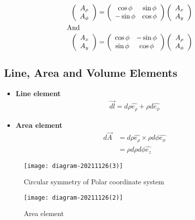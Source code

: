 \begin{align*}
\left(\begin{array}{c}
A_{\rho} \\
A_{\phi}
\end{array}\right)&=\left(\begin{array}{cc}
\cos \phi & \sin \phi \\
-\sin \phi & \cos \phi
\end{array}\right)\left(\begin{array}{c}
A_{x} \\
A_{y}
\end{array}\right) \\\intertext { And } \quad\left(\begin{array}{c}
A_{x} \\
A_{y}
\end{array}\right)&=\left(\begin{array}{cc}
\cos \phi & -\sin \phi \\
\sin \phi & \cos \phi
\end{array}\right)\left(\begin{array}{c}
A_{\rho} \\
A_{\phi}
\end{array}\right)
\end{align*}

\subsection{Line, Area and Volume Elements}
\begin{itemize}
	\item \textbf{Line element}
	\begin{align*}
	\vec{dl}=d \rho \hat{e_{\rho}}+\rho d \hat{e_{\phi}}
	\end{align*}
	\item \textbf{Area element} \begin{align*}
	d \vec{A}&=d \rho \hat{e_{\rho}} \times \rho d \phi \hat{e_{\phi}}\\&=\rho d \rho d \phi \hat{e_{z}}
	\end{align*}
\end{itemize}
	\begin{figure}[h]
	\begin{minipage}{0.45\textwidth}
		\texttt{[image: diagram-20211126(3)]}
		\caption{Circular symmetry of Polar coordinate system}
		
	\end{minipage}\hfill
	\begin{minipage}{0.45\textwidth}
		\texttt{[image: diagram-20211126(2)]}
		\caption{Area element}
	\end{minipage}
\end{figure}
